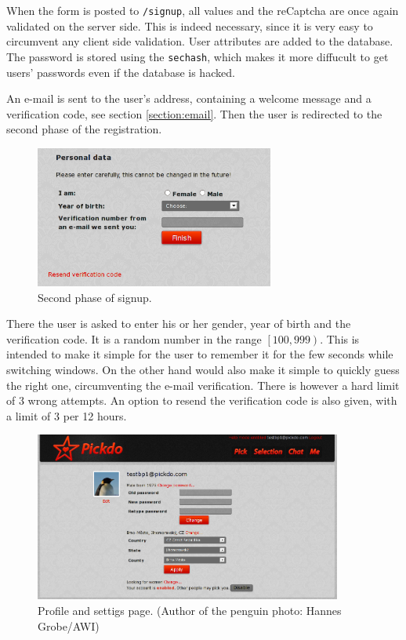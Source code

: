 \documentclass[12pt,oneside]{fithesis}
\begin{document}
		When the form is posted to \texttt{/signup}, all values and the reCaptcha are once again validated on the server side. This is indeed necessary, since it is very easy to circumvent any client side validation. User attributes are added to the database. The password is stored using the \texttt{sechash}, which makes it more diffucult to get users' passwords even if the database is hacked.
		
		An e-mail is sent to the user's address, containing a welcome message and a verification code, see section \ref{section:email}. Then the user is redirected to the second phase of the registration.
		
		\begin{figure}[h]
	  \centering
	    \includegraphics[width=0.7\textwidth]{screen-signup1.png}
		  \caption{Second phase of signup.}
		  \label{fig:screen-signup1}
	  \end{figure}
	  There the user is asked to enter his or her gender, year of birth and the verification code. It is a random number in the range $\left[ 100,999\right)$. This is intended to make it simple for the user to remember it for the few seconds while switching windows. On the other hand would also make it simple to quickly guess the right one, circumventing the e-mail verification. There is however a hard limit of 3 wrong attempts. An option to resend the verification code is also given, with a limit of 3 per 12 hours.
	  
		\begin{figure}[h]
	  \centering
	    \includegraphics[width=0.9\textwidth]{screen-profile.png}
		  \caption{Profile and settigs page. (Author of the penguin photo: Hannes Grobe/AWI)}
		  \label{fig:screen-profile}
	  \end{figure}	  
	  
\end{document}
